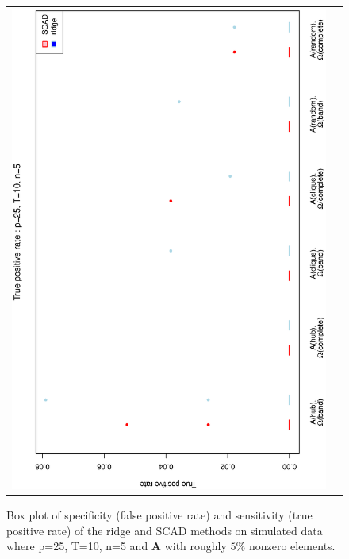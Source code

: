 \begin{figure}[h!]
\begin{tabular}{cc}
\includegraphics[scale=0.45,angle=270]{ROCtpr25T10N5_5.eps}
\end{tabular}
\caption{Box plot of specificity (false positive rate) and sensitivity (true positive rate) of the ridge and SCAD methods on simulated data where p=25, T=10,  n=5 and $\mathbf{A}$ with roughly $5\%$ nonzero elements.}
\label{figSM:RocP25T10N5_5}
\end{figure}



